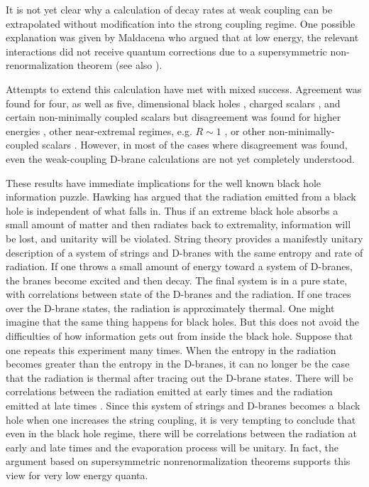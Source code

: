\documentclass[12pt]{article}
\begin{document}
It
is not yet clear why a calculation of decay rates at weak coupling can be
extrapolated without modification into the strong coupling regime. One
possible explanation was given by Maldacena \cite{mald} who argued that at low
energy, the relevant interactions did not receive quantum corrections due
to a supersymmetric non-renormalization theorem (see also \cite{das}).

Attempts to extend this calculation have met with mixed success.
Agreement was found for four, as well as five, dimensional black holes 
\cite{gukl}, charged scalars \cite{mast2,gukl},  and
certain non-minimally coupled scalars \cite{cgkt,krt} but disagreement was
found for higher energies \cite{deal,dkt}, other near-extremal
regimes, e.g. $R\sim 1$ \cite{hata,dkt}, or other non-minimally-coupled
scalars \cite{krkl}.
However, in  most of the cases where disagreement was found,
even the weak-coupling D-brane
calculations are not yet completely understood.

These results have immediate implications for the well known
black hole information puzzle. Hawking has argued that the radiation
emitted from a black hole is independent of what falls in. Thus if an
extreme black hole absorbs a small amount of matter and then radiates back
to extremality, information will be lost, and unitarity will be
violated.
String theory provides a manifestly unitary description of a
system of strings and D-branes with the same entropy and rate of radiation.
If one throws a small amount of energy toward a system of D-branes, the
branes become excited and then decay. The final system is in a pure state,
with correlations between state of the D-branes and the radiation. If
one traces over the D-brane states, the radiation is approximately
thermal.
One might imagine that the same thing happens for black holes. But this
does not avoid the difficulties of how information gets out from inside
the black hole. 
Suppose that one repeats this experiment many times. When the entropy in
the radiation becomes greater than the entropy in the D-branes, it can
no longer be the case that the radiation is thermal  after tracing out
the D-brane states. There will be  correlations between the radiation
emitted at early times and the radiation emitted at late times \cite{page2}.
Since this system of strings and D-branes becomes a black hole when
one increases the string coupling, 
it is very tempting to conclude that even in the black hole regime, there
will be correlations between the radiation at early and late times 
and the evaporation process will be unitary. 
In fact, the argument based on supersymmetric
nonrenormalization theorems \cite{mald} supports this view
for very low energy quanta.
\end{document}
